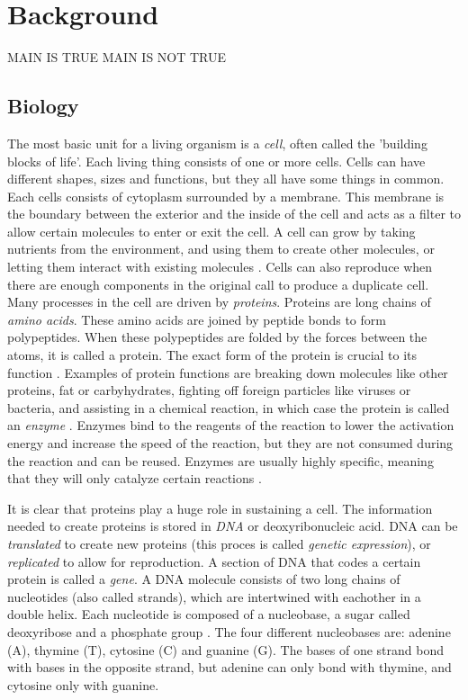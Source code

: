 \documentclass[../main/thesis.tex]{subfiles}
\begin{document}
\chapter{Background}
\ifdefined\main
\acresetall
MAIN IS TRUE
\newcommand{\codePath}{../2_background/code/}
\newcommand{\figPath}{../2_background/figures/}
\else
MAIN IS NOT TRUE

\fi


\section{Biology}
The most basic unit for a living organism is a \textit{cell}, often called the 'building blocks of life'.
Each living thing consists of one or more cells.
Cells can have different shapes, sizes and functions, but they all have some things in common.
Each cells consists of cytoplasm surrounded by a membrane.
This membrane is the boundary between the exterior and the inside of the cell and acts as a filter to allow certain molecules to enter or exit the cell.
A cell can grow by taking nutrients from the environment, and using them to create other molecules, or letting them interact with existing molecules \cite{bioinformatics}.
Cells can also reproduce when there are enough components in the original call to produce a duplicate cell.
Many processes in the cell are driven by \textit{proteins}.
Proteins are long chains of \textit{amino acids}.
These amino acids are joined by peptide bonds to form polypeptides.
When these polypeptides are folded by the forces between the atoms, it is called a protein.
The exact form of the protein is crucial to its function \cite{protein_misfolding}.
Examples of protein functions are breaking down molecules like other proteins, fat or carbyhydrates, fighting off foreign particles like viruses or bacteria, and assisting in a chemical reaction, in which case the protein is called an \textit{enzyme} \cite{protein_function}.
Enzymes bind to the reagents of the reaction to lower the activation energy and increase the speed of the reaction, but they are not consumed during the reaction and can be reused.
Enzymes are usually highly specific, meaning that they will only catalyze certain reactions \cite{enzyme_specificity1}\cite{enzyme_specificity2}.

It is clear that proteins play a huge role in sustaining a cell.
The information needed to create proteins is stored in \textit{DNA} or deoxyribonucleic acid.
DNA can be \textit{translated} to create new proteins (this proces is called \textit{genetic expression}), or \textit{replicated} to allow for reproduction.
A section of DNA that codes a certain protein is called a \textit{gene}.
A DNA molecule consists of two long chains of nucleotides (also called strands), which are intertwined with eachother in a double helix.
Each nucleotide is composed of a nucleobase, a sugar called deoxyribose and a phosphate group \cite{dna_structure}.
The four different nucleobases are: adenine (A), thymine (T), cytosine (C) and guanine (G).
The bases of one strand bond with bases in the opposite strand, but adenine can only bond with thymine, and cytosine only with guanine.
\end{document}
